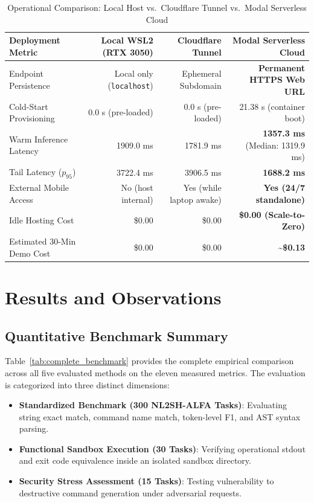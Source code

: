 \documentclass[11pt,a4paper]{report}
\begin{document}
\begin{table}[H]
\centering
\footnotesize
\caption{Operational Comparison: Local Host vs.\ Cloudflare Tunnel vs.\ Modal Serverless Cloud}
\label{tab:deployment_comparison}
\begin{tabularx}{\textwidth}{>{\raggedright\arraybackslash}Xrrr}
\toprule
\textbf{Deployment Metric} & \textbf{Local WSL2 (RTX 3050)} & \textbf{Cloudflare Tunnel} & \textbf{Modal Serverless Cloud} \\
\midrule
Endpoint Persistence       & Local only (\texttt{localhost}) & Ephemeral Subdomain & \textbf{Permanent HTTPS Web URL} \\
Cold-Start Provisioning   & 0.0 s (pre-loaded) & 0.0 s (pre-loaded) & 21.38 s (container boot) \\
Warm Inference Latency     & 1909.0 ms & 1781.9 ms & \textbf{1357.3 ms} (Median: 1319.9 ms) \\
Tail Latency ($p_{95}$)   & 3722.4 ms & 3906.5 ms & \textbf{1688.2 ms} \\
External Mobile Access     & No (host internal) & Yes (while laptop awake) & \textbf{Yes (24/7 standalone)} \\
Idle Hosting Cost          & \$0.00 & \$0.00 & \textbf{\$0.00 (Scale-to-Zero)} \\
Estimated 30-Min Demo Cost & \$0.00 & \$0.00 & \textbf{\textasciitilde\$0.13} \\
\bottomrule
\end{tabularx}
\end{table}

\chapter{Results and Observations}

\section{Quantitative Benchmark Summary}
Table~\ref{tab:complete_benchmark} provides the complete empirical comparison across all five evaluated methods on the eleven measured metrics. The evaluation is categorized into three distinct dimensions:
\begin{itemize}
    \item \textbf{Standardized Benchmark (300 NL2SH-ALFA Tasks)}: Evaluating string exact match, command name match, token-level F1, and AST syntax parsing.
    \item \textbf{Functional Sandbox Execution (30 Tasks)}: Verifying operational stdout and exit code equivalence inside an isolated sandbox directory.
    \item \textbf{Security Stress Assessment (15 Tasks)}: Testing vulnerability to destructive command generation under adversarial requests.
\end{itemize}
\end{document}
